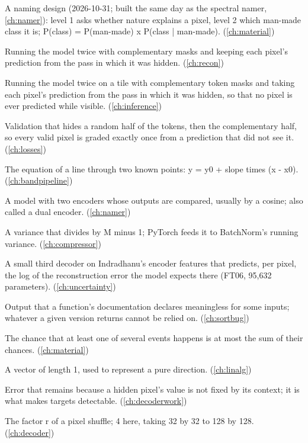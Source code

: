\begin{description}[style=nextline,leftmargin=1.2em,font=\normalfont\bfseries]
\item[Two-level namer] A naming design (2026-10-31; built the same day as the spectral namer, \cref{ch:namer}): level 1 asks whether nature explains a pixel, level 2 which man-made class it is; P(class) = P(man-made) x P(class | man-made). (\cref{ch:material})
\item[Two-pass inference] Running the model twice with complementary masks and keeping each pixel's prediction from the pass in which it was hidden. (\cref{ch:recon})
\item[Two-pass masking] Running the model twice on a tile with complementary token masks and taking each pixel's prediction from the pass in which it was hidden, so that no pixel is ever predicted while visible. (\cref{ch:inference})
\item[Two-pass validation] Validation that hides a random half of the tokens, then the complementary half, so every valid pixel is graded exactly once from a prediction that did not see it. (\cref{ch:losses})
\item[Two-point form] The equation of a line through two known points: y = y0 + slope times (x - x0). (\cref{ch:bandpipeline})
\item[Two-tower model] A model with two encoders whose outputs are compared, usually by a cosine; also called a dual encoder. (\cref{ch:namer})
\item[Unbiased variance] A variance that divides by M minus 1; PyTorch feeds it to BatchNorm's running variance. (\cref{ch:compressor})
\item[Uncertainty head] A small third decoder on Indradhanu's encoder features that predicts, per pixel, the log of the reconstruction error the model expects there (FT06, 95,632 parameters). (\cref{ch:uncertainty})
\item[Undefined behaviour (by contract)] Output that a function's documentation declares meaningless for some inputs; whatever a given version returns cannot be relied on. (\cref{ch:sortbug})
\item[Union bound] The chance that at least one of several events happens is at most the sum of their chances. (\cref{ch:material})
\item[Unit vector] A vector of length 1, used to represent a pure direction. (\cref{ch:linalg})
\item[Unpredictability] Error that remains because a hidden pixel's value is not fixed by its context; it is what makes targets detectable. (\cref{ch:decoderwork})
\item[Upscale factor] The factor r of a pixel shuffle; 4 here, taking 32 by 32 to 128 by 128. (\cref{ch:decoder})

\end{description}
